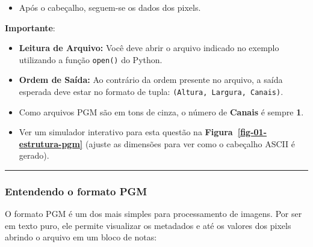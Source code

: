 \documentclass[
  portuguese,
  letterpaper,
  openany,
  oneside,
  12pt,
  a4paper]{book}
\providecommand{\tightlist}{%
  \setlength{\itemsep}{0pt}\setlength{\parskip}{0pt}}
\begin{document}
\begin{itemize}
\tightlist
\item
  Após o cabeçalho, seguem-se os dados dos pixels.
\end{itemize}

 \textbf{Importante}:

\begin{itemize}
\tightlist
\item
  \textbf{Leitura de Arquivo:} Você deve abrir o arquivo indicado no
  exemplo utilizando a função \texttt{open()} do Python.
\item
  \textbf{Ordem de Saída:} Ao contrário da ordem presente no arquivo, a
  saída esperada deve estar no formato de tupla:
  \texttt{(Altura,\ Largura,\ Canais)}.
\item
  Como arquivos PGM são em tons de cinza, o número de \textbf{Canais} é
  sempre \textbf{1}.
\item
  Ver um simulador interativo para esta questão na
  \textbf{Figura~\ref{fig-01-estrutura-pgm}} (ajuste as dimensões para
  ver como o cabeçalho ASCII é gerado).
\end{itemize}

\begin{center}\rule{0.5\linewidth}{0.5pt}\end{center}

\subsubsection{\texorpdfstring{ Entendendo o formato
PGM}{ Entendendo o formato PGM}}\label{entendendo-o-formato-pgm}

O formato PGM é um dos mais simples para processamento de imagens. Por
ser em texto puro, ele permite visualizar os metadados e até os valores
dos pixels abrindo o arquivo em um bloco de notas:
\end{document}
